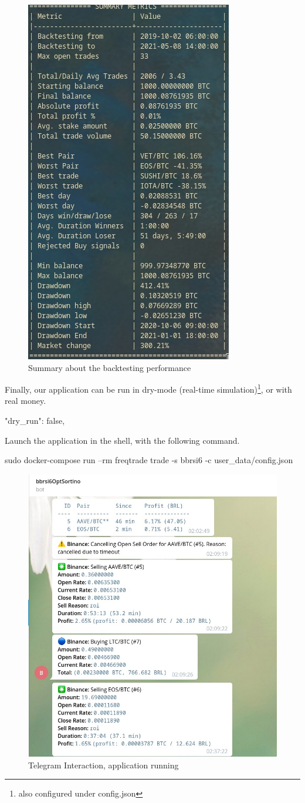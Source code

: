 \documentclass[
12pt,				%
openright,			%
oneside,			%
a4paper,			%
brazil,				%
english,			%
]{abntex2}
\begin{document}
\begin{figure}[ht]
  \centering
    \caption{\label{fig:freqtrade-running} Summary about the backtesting performance}
  \includegraphics[width=0.3\linewidth]{Imagens/freqtrade5.jpeg}
\end{figure}

Finally, our application can be run in dry-mode (real-time simulation)\footnote{also configured under config.json}, or with real money.

\begin{python}
"dry_run": false,
\end{python}

Launch the application in the shell, with the following command.
\begin{shell}
sudo docker-compose run --rm freqtrade trade -s bbrsi6 -c user_data/config.json
\end{shell}

\begin{figure}[ht]
  \centering
    \caption{\label{fig:freqtrade-running} Telegram Interaction, application running}
    \includegraphics[width=0.45\linewidth]{Imagens/freqtrade1.jpeg}
\end{figure}
\end{document}
